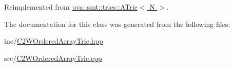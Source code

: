 Reimplemented from \hyperlink{classuva_1_1smt_1_1tries_1_1_a_trie_a4c523028bdf0949d762d1bbfd3fdc262}{uva\+::smt\+::tries\+::\+A\+Trie$<$ N $>$}.



The documentation for this class was generated from the following files\+:\begin{DoxyCompactItemize}
\item 
inc/\hyperlink{_c2_w_ordered_array_trie_8hpp}{C2\+W\+Ordered\+Array\+Trie.\+hpp}\item 
src/\hyperlink{_c2_w_ordered_array_trie_8cpp}{C2\+W\+Ordered\+Array\+Trie.\+cpp}\end{DoxyCompactItemize}
